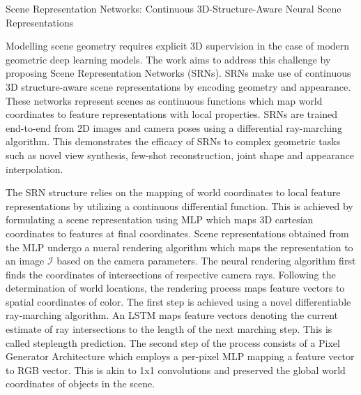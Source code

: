 \documentclass[11pt,letterpaper]{article}
\begin{document}
\begin{center}
  \large{Scene Representation Networks: Continuous
  3D-Structure-Aware Neural Scene Representations}
\end{center}

Modelling scene geometry requires explicit 3D supervision in the case of modern geometric deep learning models. The work aims to address this challenge by proposing Scene Representation Networks (SRNs). SRNs make use of continuous 3D structure-aware scene representations by encoding geometry and appearance. These networks represent scenes as continuous functions which map world coordinates to feature representations with local properties. SRNs are trained end-to-end from 2D images and camera poses using a differential ray-marching algorithm. This demonstrates the efficacy of SRNs to complex geometric tasks such as novel view synthesis, few-shot reconstruction, joint shape and appearance interpolation. 

The SRN structure relies on the mapping of world coordinates to local feature representations by utilizing a continuous differential function. This is achieved by formulating a scene representation using MLP which maps 3D cartesian coordinates to features at final coordinates. Scene representations obtained from the MLP undergo a nueral rendering algorithm which maps the representation to an image $\mathcal{I}$ based on the camera parameters. The neural rendering algorithm first finds the coordinates of intersections of respective camera rays. Following the determination of world locations, the rendering process maps feature vectors to spatial coordinates of color. The first step is achieved using a novel differentiable ray-marching algorithm. An LSTM maps feature vectors denoting the current estimate of ray intersections to the length of the next marching step. This is called steplength prediction. The second step of the process consists of a Pixel Generator Architecture which employs a per-pixel MLP mapping a feature vector to RGB vector. This is akin to 1x1 convolutions and preserved the global world coordinates of objects in the scene.
\end{document}
